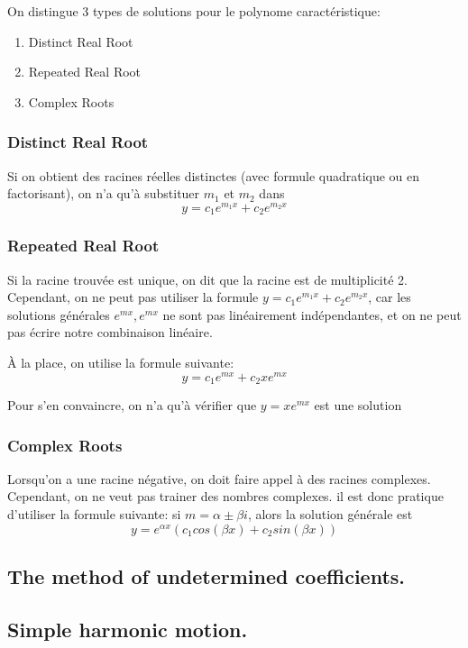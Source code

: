 \documentclass{article}
\begin{document}
On distingue 3 types de solutions pour le polynome caractéristique:
\begin{enumerate}
    \item Distinct Real Root
    \item Repeated Real Root
    \item Complex Roots
\end{enumerate}

\subsubsection{Distinct Real Root}

Si on obtient des racines réelles distinctes (avec formule quadratique
ou en factorisant), on n'a qu'à substituer $m_1$ et $m_2$ dans
$$ y= c_1 e^{m_1x}+c_2 e^{m_2x} $$

\subsubsection{Repeated Real Root}

Si la racine trouvée est unique, on dit que la racine est de multiplicité
2. Cependant, on ne peut pas utiliser la formule
$ y= c_1 e^{m_1x}+c_2 e^{m_2x} $, car les solutions générales
${e^{mx}, e^{mx}}$ ne sont pas linéairement indépendantes, et on ne
peut pas écrire notre combinaison linéaire.

À la place, on utilise la formule suivante:
$$ y= c_1 e^{mx}+c_2 xe^{mx} $$

Pour s'en convaincre, on n'a qu'à vérifier que $y=xe^{mx}$ est une
solution

\subsubsection{Complex Roots}

Lorsqu'on a une racine négative, on doit faire appel à des racines
complexes. Cependant, on ne veut pas trainer des nombres complexes.
il est donc pratique d'utiliser la formule suivante:
si $ m = \alpha \pm \beta i$, alors la solution générale est
$$ y = e^ {\alpha x} (c_1 cos(\beta x) + c_2 sin(\beta x)) $$

\subsection{The method of undetermined coefficients.}
\subsection{Simple harmonic motion.}
\end{document}
